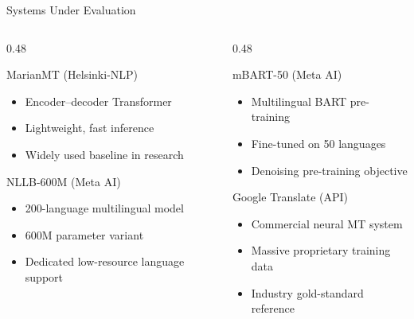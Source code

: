 \documentclass{beamer}
\begin{document}
\begin{frame}{Systems Under Evaluation}
  \begin{columns}[T]
    \begin{column}{0.48\textwidth}
      \begin{block}{MarianMT (Helsinki-NLP)}
        \begin{itemize}
          \item Encoder–decoder Transformer
          \item Lightweight, fast inference
          \item Widely used baseline in research
        \end{itemize}
      \end{block}
      \vspace{0.3cm}
      \begin{block}{NLLB-600M (Meta AI)}
        \begin{itemize}
          \item 200-language multilingual model
          \item 600M parameter variant
          \item Dedicated low-resource language support
        \end{itemize}
      \end{block}
    \end{column}
    \begin{column}{0.48\textwidth}
      \begin{block}{mBART-50 (Meta AI)}
        \begin{itemize}
          \item Multilingual BART pre-training
          \item Fine-tuned on 50 languages
          \item Denoising pre-training objective
        \end{itemize}
      \end{block}
      \begin{block}{Google Translate (API)}
        \begin{itemize}
          \item Commercial neural MT system
          \item Massive proprietary training data
          \item Industry gold-standard reference
        \end{itemize}
      \end{block}
    \end{column}
  \end{columns}
\end{frame}
\end{document}
